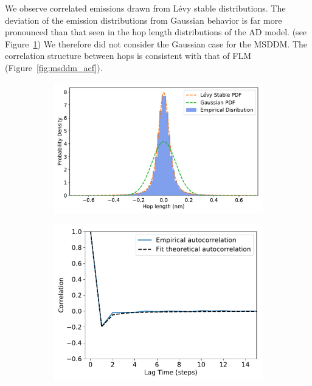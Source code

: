 \documentclass{article}
\begin{document}
  We observe correlated emissions drawn from L\'evy stable distributions. The
  deviation of the emission distributions from Gaussian behavior is far more
  pronounced than that seen in the hop length distributions of the AD model.
  (see Figure~\ref{fig:gaussian_levy_comparison}) We therefore did not consider
  the Gaussian case for the MSDDM. The correlation structure between hops is 
  consistent with that of FLM (Figure~\ref{fig:msddm_acf}).  
  
  \begin{figure}
  \centering
  \begin{subfigure}{0.49\textwidth}
  \includegraphics[width=\textwidth]{gaussian_levy_comparison.pdf}
  \caption{}\label{fig:gaussian_levy_comparison}
  \end{subfigure}
  \begin{subfigure}{0.42\textwidth}
  \includegraphics[width=\textwidth]{msddm_acf.pdf}

\end{subfigure}
\end{figure}
\end{document}
